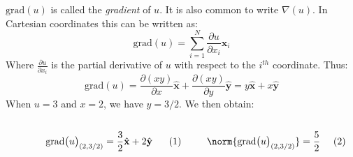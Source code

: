             \begin{solution}
                $\mathrm{grad}(u)$ is called the \textit{gradient}
                of $u$. It is also common to write $\nabla(u)$.
                In Cartesian coordinates this can be written as:
                \begin{equation}
                    \mathrm{grad}(u)=\sum_{i=1}^{N}
                        \frac{\partial u}{\partial x_{i}}
                        \hat{\mathbf{x}}_{i}
                \end{equation}
                Where $\frac{\partial u}{\partial x_{i}}$
                is the partial derivative of
                $u$ with respect to the $i^{th}$ coordinate. Thus:
                \begin{equation}
                    \mathrm{grad}(u)
                    =\frac{\partial(xy)}{\partial{x}}
                          \hat{\mathbf{x}}
                    +\frac{\partial(xy)}{\partial{y}}
                        \hat{\mathbf{y}}
                    =y\hat{\mathbf{x}}+x\hat{\mathbf{y}}
                \end{equation}
                When $u=3$ and $x=2$, we have $y=3/2$.
                We then obtain:
                \par
                \begin{subequations}
                    \begin{minipage}{0.49\textwidth}
                        \centering
                        \begin{equation}
                            \mathrm{grad}\big(u\big)_{(2,3/2)}
                            =\frac{3}{2}\hat{\mathbf{x}}
                                +2\hat{\mathbf{y}}
                        \end{equation}
                    \end{minipage}
                    \hfill
                    \begin{minipage}{0.49\textwidth}
                        \centering
                        \begin{equation}
                            \norm{\mathrm{grad}\big(u\big)_{(2,3/2)}}
                            =\frac{5}{2}
                        \end{equation}
                    \end{minipage}
                \end{subequations}
                \par\hfill\par

\end{solution}

